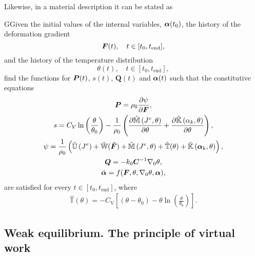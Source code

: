 Likewise, in a material description it can be stated as
    \begin{problem}
    GGiven the initial values of the internal variables, $\bm{\alpha}(t_0)$, the history of the deformation gradient
    \begin{equation}
        \bm{F}(t),\quad t\in[t_0,t_\text{end}],
    \end{equation}
    and the history of the temperature distribution
    \begin{equation}
    \theta(t),\quad t\in[t_0,t_\text{end}],
    \end{equation}
    find the functions for $\bm{P}(t)$, \(s(t)\), \(\bm Q(t)\) and $\bm{\alpha}(t)$ such that the constitutive equations
    \begin{gather}
        \bm{P} = \rho_0 \frac{\partial \psi}{\partial \bm{F}},\\
        s = C_{V} \ln \left(\frac{\theta}{\theta_{0}}\right)-\frac{1}{\rho_{0}}\left(\frac{\partial \hat{\mathbb{M}}\left(J^{e}, \theta\right)}{\partial \theta}+\frac{\partial \hat{\mathbb{K}}\left(\alpha_{k}, \theta\right)}{\partial \theta}\right),\\
        \psi =\frac{1}{\rho_0}\left( \hat{\mathbb{U}}\left(J^{e}\right)+\hat{\mathbb{W}}(\tilde{\boldsymbol{F}})+\hat{\mathbb{M}}\left(J^{e}, \theta\right)+\hat{\mathbb{T}}(\theta)+\hat{\mathbb{K}}\left(\boldsymbol{\alpha}_{\mathrm{k}}, \theta\right)\right),\\
        \bm Q = - k_0 \bm C^{-1} \nabla_0 \theta,\\
        \dot{\bm{\alpha}} = f(\bm{F}, \theta, \nabla_0 \theta,\bm{\alpha}),
    \end{gather}
    are satisfied for every $t\in [t_0, t_\text{end}]$, where
    \begin{gather}
    \hat{\mathbb T}(\theta) = - C_{\mathrm{V}}\left[\left(\theta-\theta_{0}\right)-\theta \ln \left(\frac{\theta}{\theta_{0}}\right)\right].
    \end{gather}
    \end{problem}

\subsection{Weak equilibrium. The principle of virtual work}

